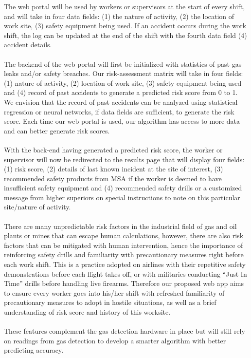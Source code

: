 \documentclass[twoside,twocolumn]{article}
\begin{document}
The web portal will be used by workers or supervisors at the start of every shift, and will take in four data fields: (1) the nature of activity, (2) the location of work site, (3) safety equipment being used. If an accident occurs during the work shift, the log can be updated at the end of the shift with the fourth data field (4) accident details.\\\\
The backend of the web portal will first be initialized with statistics of past gas leaks and/or safety breaches. Our risk-assessment matrix will take in four fields: (1) nature of activity, (2) location of work site, (3) safety equipment being used and (4) record of past accidents to generate a predicted risk score from 0 to 1. We envision that the record of past accidents can be analyzed using statistical regression or neural networks, if data fields are sufficient, to generate the risk score. Each time our web portal is used, our algorithm has access to more data and can better generate risk scores.\\\\
With the back-end having generated a predicted risk score, the worker or supervisor will now be redirected to the results page that will display four fields: (1) risk score, (2) details of last known incident at the site of interest, (3) recommended safety products from MSA if the worker is deemed to have insufficient safety equipment and (4) recommended safety drills or a customized message from higher superiors on special instructions to note on this particular site/nature of activity.\\\\
There are many unpredictable risk factors in the industrial field of gas and oil plants or mines that can escape human calculations, however, there are also risk factors that can be mitigated with human intervention, hence the importance of reinforcing safety drills and familiarity with precautionary measures right before each work shift. This is a practice adopted on airlines with their repetitive safety demonstrations before each flight takes off, or with militaries conducting ``Just In Time'' drills before handling live firearms. Therefore our proposed web app aims to ensure every worker goes into his/her shift with refreshed familiarity of precautionary measures to adopt in hostile situations, as well as a brief understanding of risk score and history of this worksite.\\\\
These features complement the gas detection hardware in place but will still rely on readings from gas detection to develop a smarter algorithm with better predicting accuracy.\\\\
\end{document}
